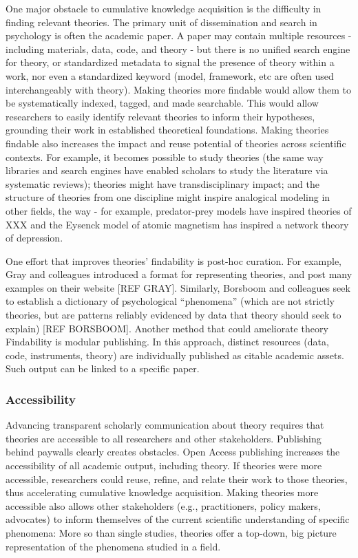 \documentclass[
  man]{apa6}
\begin{document}
One major obstacle to cumulative knowledge acquisition is the difficulty in finding relevant theories.
The primary unit of dissemination and search in psychology is often the academic paper.
A paper may contain multiple resources - including materials, data, code, and theory - but there is no unified search engine for theory,
or standardized metadata to signal the presence of theory within a work,
nor even a standardized keyword (model, framework, etc are often used interchangeably with theory).
Making theories more findable would allow them to be systematically indexed, tagged, and made searchable.
This would allow researchers to easily identify relevant theories to inform their hypotheses,
grounding their work in established theoretical foundations.
Making theories findable also increases the impact and reuse potential of theories across scientific contexts.
For example, it becomes possible to study theories (the same way libraries and search engines have enabled scholars to study the literature via systematic reviews);
theories might have transdisciplinary impact;
and the structure of theories from one discipline might inspire analogical modeling in other fields, the way - for example, predator-prey models have inspired theories of XXX and the Eysenck model of atomic magnetism has inspired a network theory of depression.

One effort that improves theories' findability is post-hoc curation.
For example, Gray and colleagues introduced a format for representing theories,
and post many examples on their website {[}REF GRAY{]}.
Similarly, Borsboom and colleagues seek to establish a dictionary of psychological ``phenomena'' (which are not strictly theories, but are patterns reliably evidenced by data that theory should seek to explain) {[}REF BORSBOOM{]}.
Another method that could ameliorate theory Findability is modular publishing.
In this approach, distinct resources (data, code, instruments, theory) are individually published as citable academic assets.
Such output can be linked to a specific paper.

\subsubsection{Accessibility}\label{accessibility}

Advancing transparent scholarly communication about theory requires that theories are accessible to all researchers and other stakeholders.
Publishing behind paywalls clearly creates obstacles.
Open Access publishing increases the accessibility of all academic output, including theory.
If theories were more accessible, researchers could reuse, refine, and relate their work to those theories, thus accelerating cumulative knowledge acquisition.
Making theories more accessible also allows other stakeholders (e.g., practitioners, policy makers, advocates) to inform themselves of the current scientific understanding of specific phenomena:
More so than single studies, theories offer a top-down, big picture representation of the phenomena studied in a field.
\end{document}
